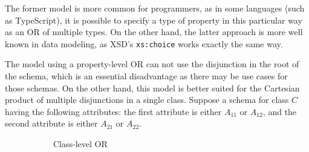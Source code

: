 The former model is more common for programmers, as in some languages (such as TypeScript), it is possible to specify a type of property in this particular way as an OR of multiple types. On the other hand, the latter approach is more well known in data modeling, as XSD's {\tt xs:choice} works exactly the same way.

The model using a property-level OR can not use the disjunction in the root of the schema, which is an essential disadvantage as there may be use cases for those schemas. On the other hand, this model is better suited for the Cartesian product of multiple disjunctions in a single class. Suppose a schema for class $C$ having the following attributes: the first attribute is either $A_11$ or $A_12$, and the second attribute is either $A_21$ or $A_22$.

\begin{figure}[h!]\centering
  \begin{subfigure}[b]{.6\textwidth}
    \centering
    \caption{Class-level OR}
    \end{subfigure}%
    \begin{subfigure}[b]{.4\textwidth}
    \centering
\end{subfigure}
\end{figure}
